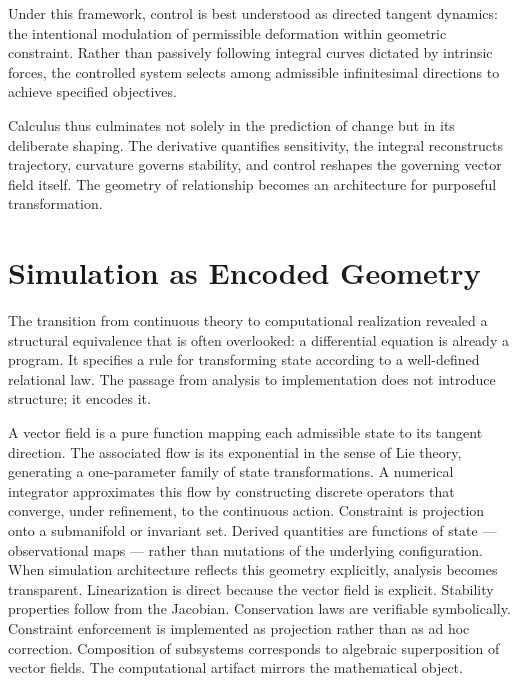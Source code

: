 \documentclass[12pt]{book}
\begin{document}
Under this framework, control is best understood as directed tangent
dynamics: the intentional modulation of permissible deformation within
geometric constraint. Rather than passively following integral curves
dictated by intrinsic forces, the controlled system selects among
admissible infinitesimal directions to achieve specified objectives.

Calculus thus culminates not solely in the prediction of change but in
its deliberate shaping. The derivative quantifies sensitivity, the
integral reconstructs trajectory, curvature governs stability, and
control reshapes the governing vector field itself. The geometry of
relationship becomes an architecture for purposeful transformation.


\section{Simulation as Encoded Geometry}
The transition from continuous theory to computational realization revealed a structural equivalence that is often overlooked: a differential equation is already a program. It specifies a rule for transforming state according to a well-defined relational law. The passage from analysis to implementation does not introduce structure; it encodes it.

A vector field is a pure function mapping each admissible state to its tangent direction. The associated flow is its exponential in the sense of Lie theory, generating a one-parameter family of state transformations. A numerical integrator approximates this flow by constructing discrete operators that converge, under refinement, to the continuous action. Constraint is projection onto a submanifold or invariant set. Derived quantities are functions of state — observational maps — rather than mutations of the underlying configuration.
When simulation architecture reflects this geometry explicitly, analysis becomes transparent. Linearization is direct because the vector field is explicit. Stability properties follow from the Jacobian. Conservation laws are verifiable symbolically. Constraint enforcement is implemented as projection rather than as ad hoc correction. Composition of subsystems corresponds to algebraic superposition of vector fields. The computational artifact mirrors the mathematical object.
\end{document}
